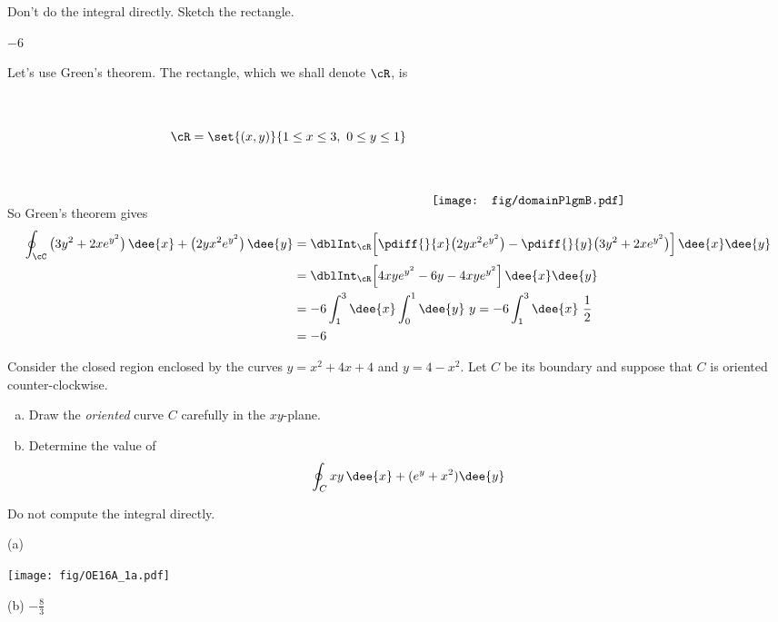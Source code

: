 \begin{hint}
Don't do the integral directly. Sketch the rectangle.
\end{hint}

\begin{answer}
$-6$
\end{answer}

\begin{solution}
Let's use Green's theorem. The
rectangle, which we shall denote $\cR$, is
\vskip0.25in
\begin{align*}
\cR=\set{(x,y)}{1\le x\le 3,\ 0\le y\le 1}
\qquad\raisebox{-50pt}[40pt][40pt]{\texttt{[image: fig/domainPlgmB.pdf]}}
\end{align*}
\vskip0.15in
\item{}So Green's theorem gives
\begin{align*}
\oint_\cC\big(3y^2+2xe^{y^2}\big)\,\dee{x} + \big(2yx^2 e^{y^2}\big)\,\dee{y}
&=\dblInt_\cR \Big[
      \pdiff{}{x}\big(2yx^2 e^{y^2}\big)
     -\pdiff{}{y}\big(3y^2+2xe^{y^2}\big)
   \Big]\,\dee{x} \dee{y} \\
&=\dblInt_\cR \Big[
      4xy e^{y^2}
     -6y -4xye^{y^2}
   \Big]\,\dee{x} \dee{y} \\
& = -6 \int_1^3 \dee{x}\int_0^1 \dee{y}\ y
       = -6 \int_1^3 \dee{x}\ \frac{1}{2} \\
&=-6
\end{align*}
\end{solution}

\begin{question}[M317 2016A] %
Consider the closed region enclosed by the curves
$y = x^2 + 4x + 4$ and $y = 4 - x^2$. Let
$C$ be its boundary and suppose that $C$ is oriented counter-clockwise.
\begin{enumerate}[(a)]
\item
   Draw the \emph{oriented} curve $C$ carefully in the $xy$-plane.
\item
    Determine the value of
    \begin{equation*}
         \oint_C xy\, \dee{x} + (e^y + x^2 ) \dee{y}
     \end{equation*}
\end{enumerate}

\end{question}

\begin{hint}
Do not compute the integral directly.
\end{hint}

\begin{answer}
(a)
\begin{center}
       \texttt{[image: fig/OE16A\_1a.pdf]}
\end{center}


(b) $-\frac{8}{3}$
\end{answer}

